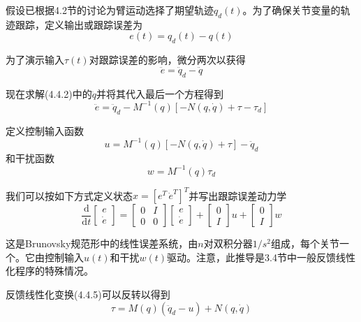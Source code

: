 \documentclass[UTF8]{ctexart}
\theoremstyle{definition}
\newcommand{\dd}{\mathrm{d}}
\begin{document}
假设已根据4.2节的讨论为臂运动选择了期望轨迹$q_d(t)$。为了确保关节变量的轨迹跟踪，定义输出或跟踪误差为
\begin{equation}
    e(t) = q_d(t) - q(t)
\end{equation}

为了演示输入$\tau(t)$对跟踪误差的影响，微分两次以获得
\begin{equation}
    \ddot{e} = \ddot{q}_d - \ddot{q}
\end{equation}

现在求解(4.4.2)中的$\ddot{q}$并将其代入最后一个方程得到
\begin{equation}
    \ddot{e} = \ddot{q}_d - M^{-1}(q)[-N(q, \dot{q}) + \tau - \tau_d]
\end{equation}

定义控制输入函数
\begin{equation}
    u = M^{-1}(q)[-N(q, \dot{q}) + \tau] - \ddot{q}_d
\end{equation}
和干扰函数
\begin{equation}
    w = M^{-1}(q)\tau_d
\end{equation}

我们可以按如下方式定义状态$x = [e^T \, \dot{e}^T]^T$并写出跟踪误差动力学
\begin{equation}
    \frac{\dd}{\dd t}\begin{bmatrix} e \\ \dot{e} \end{bmatrix} = \begin{bmatrix} 0 & I \\ 0 & 0 \end{bmatrix}\begin{bmatrix} e \\ \dot{e} \end{bmatrix} + \begin{bmatrix} 0 \\ I \end{bmatrix}u + \begin{bmatrix} 0 \\ I \end{bmatrix}w
\end{equation}

这是Brunovsky规范形中的线性误差系统，由$n$对双积分器$1/s^2$组成，每个关节一个。它由控制输入$u(t)$和干扰$w(t)$驱动。注意，此推导是3.4节中一般反馈线性化程序的特殊情况。

反馈线性化变换(4.4.5)可以反转以得到
\begin{equation}
    \tau = M(q)(\ddot{q}_d - u) + N(q, \dot{q})
\end{equation}
\end{document}
